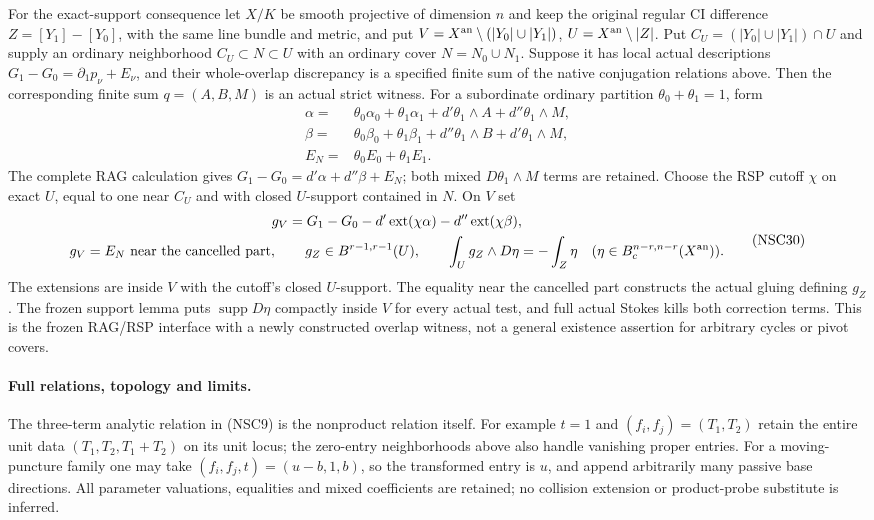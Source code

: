 For the exact-support consequence let $X/K$ be smooth
projective of dimension $n$ and keep the original
regular CI difference $Z=[Y_1]-[Y_0]$, with
the same line bundle and metric, and put
$V=X^{\rm an}\setminus(|Y_0|\cup|Y_1|)$,
$U=X^{\rm an}\setminus|Z|$.  Put
$C_U=(|Y_0|\cup|Y_1|)\cap U$ and supply an ordinary
neighborhood $C_U\subset N\subset U$ with an ordinary
cover $N=N_0\cup N_1$.  Suppose it has local actual descriptions
$G_1-G_0=\partial_1p_\nu+E_\nu$,
and their whole-overlap discrepancy is a specified
finite sum of the native conjugation relations above.
Then the corresponding finite sum $q=(A,B,M)$ is
an actual strict witness.  For a subordinate ordinary
partition $\theta_0+\theta_1=1$, form
\[
 \begin{split}
 \alpha={}&\theta_0\alpha_0+\theta_1\alpha_1
                      +d'\theta_1\wedge A+d''\theta_1\wedge M,\\
 \beta={}&\theta_0\beta_0+\theta_1\beta_1
                      +d''\theta_1\wedge B+d'\theta_1\wedge M,\\
 E_N={}&\theta_0E_0+\theta_1E_1 .
 \end{split}
 \tag{NSC29}
\]
The complete RAG calculation gives
$G_1-G_0=d'\alpha+d''\beta+E_N$; both mixed
$D\theta_1\wedge M$ terms are retained.
Choose the RSP cutoff $\chi$ on exact $U$, equal
to one near $C_U$ and with closed $U$-support contained
in $N$.  On $V$ set
\[
 \begin{gathered}
 g_V=G_1-G_0-d'\operatorname{ext}(\chi\alpha)
                    -d''\operatorname{ext}(\chi\beta),\\
 g_V=E_N\ \text{near the cancelled part},\qquad
 g_Z\in B^{r-1,r-1}(U),\qquad
          \int_Ug_Z\wedge D\eta=-\int_Z\eta
                   \quad(\eta\in B_c^{n-r,n-r}(X^{\rm an})).
 \end{gathered}
 \tag{NSC30}
\]
The extensions are inside $V$ with the cutoff's closed
$U$-support.  The equality near the cancelled part
constructs the actual gluing defining $g_Z$.
The frozen support lemma puts $\operatorname{supp}D\eta$
compactly inside $V$ for every actual test, and full
actual Stokes kills both correction terms.
This is the frozen RAG/RSP interface with a newly
constructed overlap witness, not a general existence
assertion for arbitrary cycles or pivot covers.

\paragraph{Full relations, topology and limits.}
The three-term analytic relation in (NSC9) is the
nonproduct relation itself.  For example $t=1$ and
$(f_i,f_j)=(T_1,T_2)$ retain the entire unit data
$(T_1,T_2,T_1+T_2)$ on its unit locus; the zero-entry
neighborhoods above also handle vanishing proper entries.
For a moving-puncture family one may take
$(f_i,f_j,t)=(u-b,1,b)$, so the transformed entry is $u$,
and append arbitrarily many passive base directions.
All parameter valuations, equalities and mixed
coefficients are retained; no collision extension
or product-probe substitute is inferred.

